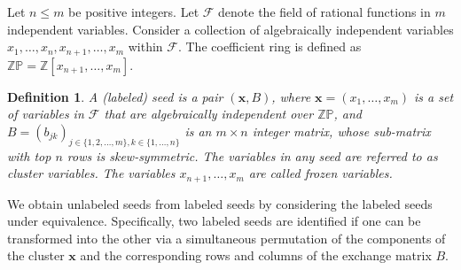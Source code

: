 \documentclass{article}
\newtheorem{definition}{Definition}
\theoremstyle{remark}
\begin{document}
Let \(n \leq m\) be positive integers. Let \(\mathcal{F}\) denote the field of rational functions in \(m\) independent variables. Consider a collection of algebraically independent variables \(x_1, \ldots, x_n, x_{n+1}, \ldots, x_m\) within \(\mathcal{F}\). The coefficient ring is defined as \(\mathbb{Z}\mathbb{P} = \mathbb{Z}[x_{n+1}, \ldots, x_m]\). 

\begin{definition}
A \emph{(labeled) seed} is a pair \((\mathbf{x}, B)\), where \(\mathbf{x} = (x_1, \ldots, x_m)\) is a set of variables in \(\mathcal{F}\) that are algebraically independent over \(\mathbb{Z}\mathbb{P}\), and \(B = (b_{jk})_{j \in \{1, 2, \ldots, m\}, k \in \{1, \ldots, n\}}\) is an \(m \times n\) integer matrix, whose sub-matrix with top $n$ rows is skew-symmetric. The variables in any seed are referred to as \emph{cluster variables}. The variables \(x_{n+1}, \ldots, x_m\) are called \emph{frozen variables}.
\end{definition}

We obtain unlabeled seeds from labeled seeds by considering the labeled seeds under equivalence. Specifically, two labeled seeds are identified if one can be transformed into the other via a simultaneous permutation of the components of the cluster $\mathbf{x}$ and the corresponding rows and columns of the exchange matrix $B$.
\end{document}

